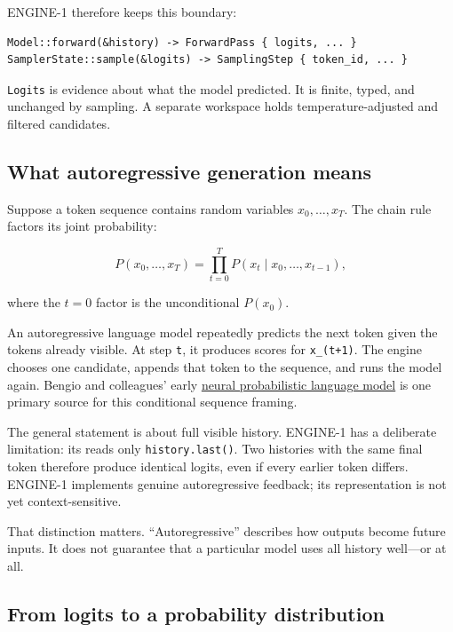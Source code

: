 \documentclass[
  10pt,
]{article}
\begin{document}
ENGINE-1 therefore keeps this boundary:

\begin{verbatim}
Model::forward(&history) -> ForwardPass { logits, ... }
SamplerState::sample(&logits) -> SamplingStep { token_id, ... }
\end{verbatim}

\texttt{Logits} is evidence about what the model predicted. It is
finite, typed, and unchanged by sampling. A separate workspace holds
temperature-adjusted and filtered candidates.

\subsection{What autoregressive generation
means}\label{what-autoregressive-generation-means}

Suppose a token sequence contains random variables \(x_0,\ldots,x_T\).
The chain rule factors its joint probability:

\[
P(x_0,\ldots,x_T)
=\prod_{t=0}^{T}P\!\left(x_t\mid x_0,\ldots,x_{t-1}\right),
\]

where the \(t=0\) factor is the unconditional \(P(x_0)\).

An autoregressive language model repeatedly predicts the next token
given the tokens already visible. At step \texttt{t}, it produces scores
for \texttt{x\_(t+1)}. The engine chooses one candidate, appends that
token to the sequence, and runs the model again. Bengio and colleagues'
early \href{https://jmlr.org/papers/v3/bengio03a.html}{neural
probabilistic language model} is one primary source for this conditional
sequence framing.

The general statement is about full visible history. ENGINE-1 has a
deliberate limitation: its \texttt{} reads
only \texttt{history.last()}. Two histories with the same final token
therefore produce identical logits, even if every earlier token differs.
ENGINE-1 implements genuine autoregressive feedback; its representation
is not yet context-sensitive.

That distinction matters. ``Autoregressive'' describes how outputs
become future inputs. It does not guarantee that a particular model uses
all history well---or at all.

\subsection{From logits to a probability
distribution}\label{from-logits-to-a-probability-distribution}
\end{document}
